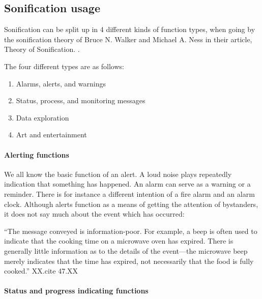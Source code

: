 
\FloatBarrier
\subsection{Sonification usage} %
\label{sub:sonification_usage}

Sonification can be split up in 4 different kinds of function types, when going by the sonification theory of Bruce N. Walker and Michael A. Ness in their article, Theory of Sonification. \cite*{walker2011}. 

The four different types are as follows:

\begin{enumerate}
    \item Alarms, alerts, and warnings
    \item Status, process, and monitoring messages
    \item Data exploration
    \item Art and entertainment
\end{enumerate}


\paragraph{Alerting functions} %
\label{par:alerting_functions}

We all know the basic function of an alert. A loud noise plays repeatedly indication that something has happened. An alarm can serve as a warning or a reminder. There is for instance a different intention of a fire alarm and an alarm clock. Although alerts function as a means of getting the attention of bystanders, it does not say much about the event which has occurred:


\enquote{The message conveyed is information-poor. For example, a beep is often used to indicate that the cooking time on a microwave oven has expired. There is generally little information as to the details of the event—the microwave beep merely indicates that the time has expired, not necessarily that the food is fully cooked.} XX.cite 47.XX



\paragraph{Status and progress indicating functions} %
\label{par:status_and_progress_functions}


